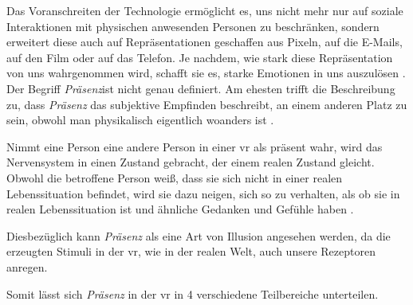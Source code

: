 \documentclass[a4paper,11pt]{article}%
\renewcommand{\\}{\vspace*{0.5\baselineskip} \newline}
\begin{document}
	Das Voranschreiten der Technologie ermöglicht es, uns nicht mehr nur auf soziale Interaktionen mit physischen anwesenden Personen zu beschränken, sondern erweitert diese auch auf Repräsentationen geschaffen aus Pixeln, auf die E-Mails, auf den Film oder auf das Telefon. Je nachdem, wie stark diese Repräsentation von uns wahrgenommen wird, schafft sie es, starke Emotionen in uns auszulösen \citep[S. 4-6]{biocca2002defining}.
%	
Der Begriff \textit{Präsenz}ist nicht genau definiert. Am ehesten trifft die Beschreibung zu, dass \textit{Präsenz} das subjektive Empfinden beschreibt, an einem anderen Platz zu sein, obwohl man physikalisch eigentlich woanders ist \citep[S. 1]{witmer1998measuring}.

	Nimmt eine Person eine andere Person in einer \ac{vr} als präsent wahr, wird das Nervensystem in einen Zustand gebracht, der einem realen Zustand gleicht. Obwohl die betroffene Person weiß, dass sie sich nicht in einer realen Lebenssituation befindet, wird sie dazu neigen, sich so zu verhalten, als ob sie in realen Lebenssituation ist und ähnliche Gedanken und Gefühle haben \citep{slater2003note}.

Diesbezüglich kann \textit{Präsenz} als eine Art von Illusion angesehen werden, da die erzeugten Stimuli in der \ac{vr}, wie in der realen Welt, auch unsere Rezeptoren anregen.

Somit lässt sich \textit{Präsenz} in der \ac{vr} in 4 verschiedene Teilbereiche unterteilen.
\end{document}
